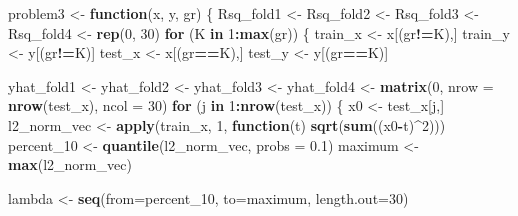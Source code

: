 \documentclass[
]{article}
\newenvironment{Shaded}{\begin{snugshade}}{\end{snugshade}}
\newcommand{\AttributeTok}[1]{\textcolor[rgb]{0.13,0.29,0.53}{#1}}
\newcommand{\ControlFlowTok}[1]{\textcolor[rgb]{0.13,0.29,0.53}{\textbf{#1}}}
\newcommand{\DecValTok}[1]{\textcolor[rgb]{0.00,0.00,0.81}{#1}}
\newcommand{\FloatTok}[1]{\textcolor[rgb]{0.00,0.00,0.81}{#1}}
\newcommand{\FunctionTok}[1]{\textcolor[rgb]{0.13,0.29,0.53}{\textbf{#1}}}
\newcommand{\NormalTok}[1]{#1}
\newcommand{\OtherTok}[1]{\textcolor[rgb]{0.56,0.35,0.01}{#1}}
\newcommand{\SpecialCharTok}[1]{\textcolor[rgb]{0.81,0.36,0.00}{\textbf{#1}}}
\begin{document}
\begin{Shaded}
\begin{Highlighting}[]
\NormalTok{problem3 }\OtherTok{\textless{}{-}} \ControlFlowTok{function}\NormalTok{(x, y, gr) \{}
\NormalTok{  Rsq\_fold1 }\OtherTok{\textless{}{-}}\NormalTok{ Rsq\_fold2 }\OtherTok{\textless{}{-}}\NormalTok{ Rsq\_fold3 }\OtherTok{\textless{}{-}}\NormalTok{ Rsq\_fold4 }\OtherTok{\textless{}{-}} \FunctionTok{rep}\NormalTok{(}\DecValTok{0}\NormalTok{, }\DecValTok{30}\NormalTok{)}
  \ControlFlowTok{for}\NormalTok{ (K }\ControlFlowTok{in} \DecValTok{1}\SpecialCharTok{:}\FunctionTok{max}\NormalTok{(gr)) \{}
\NormalTok{    train\_x }\OtherTok{\textless{}{-}}\NormalTok{ x[(gr}\SpecialCharTok{!=}\NormalTok{K),]}
\NormalTok{    train\_y }\OtherTok{\textless{}{-}}\NormalTok{ y[(gr}\SpecialCharTok{!=}\NormalTok{K)]}
\NormalTok{    test\_x }\OtherTok{\textless{}{-}}\NormalTok{ x[(gr}\SpecialCharTok{==}\NormalTok{K),]}
\NormalTok{    test\_y }\OtherTok{\textless{}{-}}\NormalTok{ y[(gr}\SpecialCharTok{==}\NormalTok{K)]}
    
\NormalTok{    yhat\_fold1 }\OtherTok{\textless{}{-}}\NormalTok{ yhat\_fold2 }\OtherTok{\textless{}{-}}\NormalTok{ yhat\_fold3 }\OtherTok{\textless{}{-}}\NormalTok{ yhat\_fold4 }\OtherTok{\textless{}{-}}
      \FunctionTok{matrix}\NormalTok{(}\DecValTok{0}\NormalTok{, }\AttributeTok{nrow =} \FunctionTok{nrow}\NormalTok{(test\_x), }\AttributeTok{ncol =} \DecValTok{30}\NormalTok{)}
    \ControlFlowTok{for}\NormalTok{ (j }\ControlFlowTok{in} \DecValTok{1}\SpecialCharTok{:}\FunctionTok{nrow}\NormalTok{(test\_x)) \{}
\NormalTok{      x0 }\OtherTok{\textless{}{-}}\NormalTok{ test\_x[j,]}
\NormalTok{      l2\_norm\_vec }\OtherTok{\textless{}{-}} \FunctionTok{apply}\NormalTok{(train\_x, }\DecValTok{1}\NormalTok{, }\ControlFlowTok{function}\NormalTok{(t) }\FunctionTok{sqrt}\NormalTok{(}\FunctionTok{sum}\NormalTok{((x0}\SpecialCharTok{{-}}\NormalTok{t)}\SpecialCharTok{\^{}}\DecValTok{2}\NormalTok{)))}
\NormalTok{      percent\_10 }\OtherTok{\textless{}{-}} \FunctionTok{quantile}\NormalTok{(l2\_norm\_vec, }\AttributeTok{probs =} \FloatTok{0.1}\NormalTok{)}
\NormalTok{      maximum }\OtherTok{\textless{}{-}} \FunctionTok{max}\NormalTok{(l2\_norm\_vec)}
      
\NormalTok{      lambda }\OtherTok{\textless{}{-}} \FunctionTok{seq}\NormalTok{(}\AttributeTok{from=}\NormalTok{percent\_10, }\AttributeTok{to=}\NormalTok{maximum, }\AttributeTok{length.out=}\DecValTok{30}\NormalTok{)}
      

\end{Highlighting}
\end{Shaded}
\end{document}

